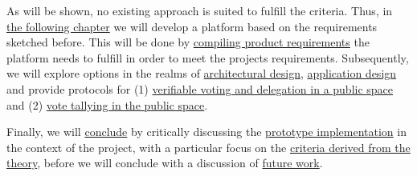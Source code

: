 As will be shown, no existing approach is suited to fulfill the criteria. Thus, in \hyperref[ch:ProjectRequirements]{the following chapter} we will develop a platform based on the requirements sketched before. This will be done by \hyperref[sec:SoftwareRequirements]{compiling product requirements} the platform needs to fulfill in order to meet the projects requirements. Subsequently, we will explore options in the realms of \hyperref[sec:ArchitecturalDesign]{architectural design}, \hyperref[sec:ApplicationDesign]{application design} and provide protocols for (1) \hyperref[sec:PublicDeclarationOfIntentProtocol]{verifiable voting and delegation in a public space} and (2) \hyperref[sec:VoteTallyingProtocol]{vote tallying in the public space}.

Finally, we will \hyperref[ch:Conclusion]{conclude} by critically discussing the \hyperref[sec:DiscussionImplementation]{prototype implementation} in the context of the project, with a particular focus on the \hyperref[sec:Criteria]{criteria derived from the theory}, before we will conclude with a discussion of \hyperref[sec:FutureWork]{future work}.